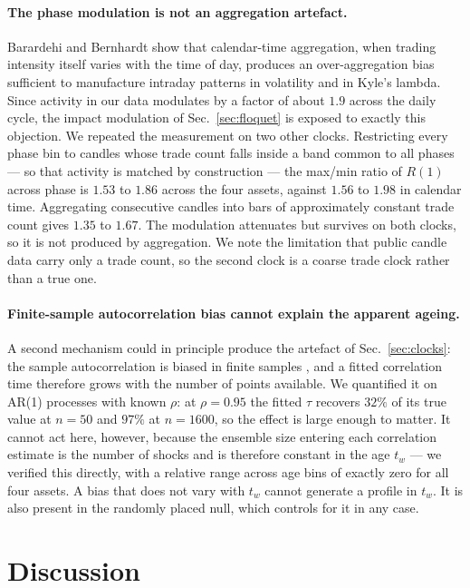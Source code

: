 \documentclass[aps,pre,twocolumn,superscriptaddress,floatfix,nofootinbib]{revtex4-2}
\begin{document}
\paragraph*{The phase modulation is not an aggregation artefact.}
Barardehi and Bernhardt \cite{barardehi2025} show that calendar-time
aggregation, when trading intensity itself varies with the time of day,
produces an over-aggregation bias sufficient to manufacture intraday patterns
in volatility and in Kyle's lambda. Since activity in our data modulates by a
factor of about $1.9$ across the daily cycle, the impact modulation of
Sec.~\ref{sec:floquet} is exposed to exactly this objection. We repeated the
measurement on two other clocks. Restricting every phase bin to candles whose
trade count falls inside a band common to all phases --- so that activity is
matched by construction --- the max/min ratio of $R(1)$ across phase is $1.53$
to $1.86$ across the four assets, against $1.56$ to $1.98$ in calendar time.
Aggregating consecutive candles into bars of approximately constant trade count
gives $1.35$ to $1.67$. The modulation attenuates but survives on both clocks,
so it is not produced by aggregation. We note the limitation that public candle
data carry only a trade count, so the second clock is a coarse trade clock
rather than a true one.

\paragraph*{Finite-sample autocorrelation bias cannot explain the apparent
ageing.} A second mechanism could in principle produce the artefact of
Sec.~\ref{sec:clocks}: the sample autocorrelation is biased in finite samples
\cite{kendall1954}, and a fitted correlation time therefore grows with the
number of points available. We quantified it on AR(1) processes with known
$\rho$: at $\rho=0.95$ the fitted $\tau$ recovers $32\%$ of its true value at
$n=50$ and $97\%$ at $n=1600$, so the effect is large enough to matter. It
cannot act here, however, because the ensemble size entering each correlation
estimate is the number of shocks and is therefore constant in the age $t_w$ ---
we verified this directly, with a relative range across age bins of exactly
zero for all four assets. A bias that does not vary with $t_w$ cannot generate
a profile in $t_w$. It is also present in the randomly placed null, which
controls for it in any case.

\section{Discussion}
\label{sec:discussion}
\end{document}

